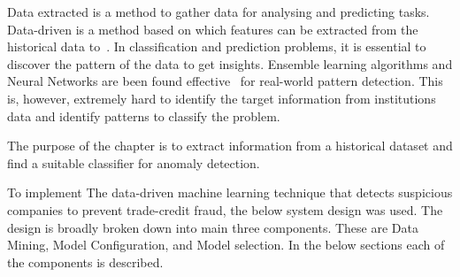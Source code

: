 Data extracted is a method to gather data for analysing and predicting tasks. Data-driven is a method based on which features can be extracted from the historical data to~\cite{SMARRA20181252}. In classification and prediction problems, it is essential to discover the pattern of the data to get insights. Ensemble learning algorithms and Neural Networks are been found effective~\cite{10.1145/3414274.3414278, RB2021} for real-world pattern detection. This is, however, extremely hard to identify the target information from institutions data and identify patterns to classify the problem. 

The purpose of the chapter is to extract information from a historical dataset and find a suitable classifier for anomaly detection. 



To implement The data-driven machine learning technique that detects suspicious companies to prevent trade-credit fraud, the below system design was used. The design is broadly broken down into main three components. These are Data Mining, Model Configuration, and Model selection. In the below sections each of the components is described. 

